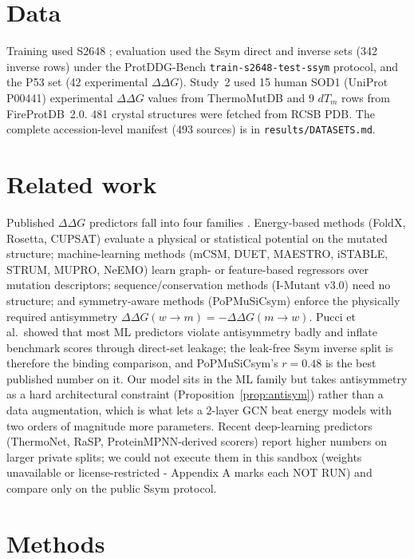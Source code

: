 \documentclass[11pt]{article}
\begin{document}
\section{Data}
\label{sec:data}
Training used S2648 \cite{pucci2018}; evaluation used the Ssym direct and
inverse sets (342 inverse rows) under the ProtDDG-Bench
\texttt{train-s2648-test-ssym} protocol, and the P53 set (42 experimental
$\Delta\Delta G$). Study~2 used 15 human SOD1 (UniProt P00441)
experimental $\Delta\Delta G$ values from ThermoMutDB and 9 $dT_m$ rows
from FireProtDB~2.0. 481 crystal structures were fetched from RCSB PDB.
The complete accession-level manifest (493 sources) is in
\texttt{results/DATASETS.md}.

\section{Related work}
Published $\Delta\Delta G$ predictors fall into four families
\cite{pucci2018}. Energy-based methods (FoldX, Rosetta, CUPSAT)
evaluate a physical or statistical potential on the mutated structure;
machine-learning methods (mCSM, DUET, MAESTRO, iSTABLE, STRUM, MUPRO,
NeEMO) learn graph- or feature-based regressors over mutation
descriptors; sequence/conservation methods (I-Mutant v3.0) need no
structure; and symmetry-aware methods (PoPMuSiCsym) enforce the
physically required antisymmetry
$\Delta\Delta G(w\!\to\!m)=-\Delta\Delta G(m\!\to\!w)$. Pucci
et al.\ showed that most ML predictors violate antisymmetry badly and
inflate benchmark scores through direct-set leakage; the leak-free
Ssym inverse split is therefore the binding comparison, and
PoPMuSiCsym's $r=0.48$ is the best published number on it. Our model
sits in the ML family but takes antisymmetry as a hard architectural
constraint (Proposition~\ref{prop:antisym}) rather than a data
augmentation, which is what lets a 2-layer GCN beat energy models with
two orders of magnitude more parameters. Recent deep-learning
predictors (ThermoNet, RaSP, ProteinMPNN-derived scorers) report
higher numbers on larger private splits; we could not execute them in
this sandbox (weights unavailable or license-restricted - Appendix A
marks each NOT RUN) and compare only on the public Ssym protocol.

\section{Methods}
\end{document}
